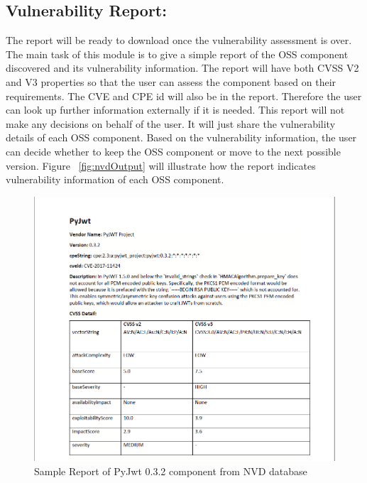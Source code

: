 \subsection{Vulnerability Report:}
The report will be ready to download once the vulnerability assessment is over. The main task of this module is to give a simple report of the \acs{OSS} component discovered and its vulnerability information. The report will have both \acs{CVSS} V2 and V3 properties so that the user can assess the component based on their requirements. The \acs{CVE} and \acs{CPE} id will also be in the report. Therefore the user can look up further information externally if it is needed. This report will not make any decisions on behalf of the user. It will just share the vulnerability details of each \acs{OSS} component. Based on the vulnerability information, the user can decide whether to keep the OSS component or move to the next possible version. Figure ~\ref{fig:nvdOutput} will illustrate how the report indicates vulnerability information of each \acs{OSS} component.
\begin{figure}[H]
	\includegraphics[width=15cm]{includes/report.PNG}
	\centering
	\caption{Sample Report of PyJwt 0.3.2 component from \acs{NVD} database}
	\label{fig:report}
\end{figure}